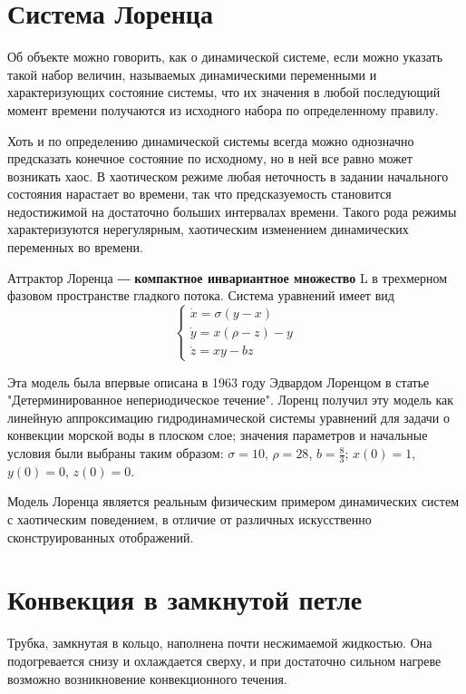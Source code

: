 \documentclass[12pt]{article}
\begin{document}

\newpage

\section{Система Лоренца}

Об объекте можно говорить, как о динамической системе, если можно указать такой набор величин, называемых динамическими переменными и характеризующих состояние системы, что их значения в любой последующий момент времени получаются из исходного набора по определенному правилу.

Хоть и по определению динамической системы всегда можно однозначно предсказать конечное состояние по исходному, но в ней все равно может возникать хаос. В хаотическом режиме любая неточность в задании начального состояния нарастает во времени, так что предсказуемость становится недостижимой на достаточно больших интервалах времени. Такого рода режимы характеризуются нерегулярным, хаотическим изменением динамических переменных во времени.

Аттрактор Лоренца ― \textbf{компактное инвариантное множество} L в трехмерном фазовом пространстве гладкого потока. Система уравнений имеет вид
$$\begin{cases}	
	\dot{x} = \sigma (y-x) \\
	\dot{y} = x(\rho-z)-y \\
	\dot{z} = xy-bz
\end{cases}$$

Эта модель была впервые описана в 1963 году Эдвардом Лоренцом в статье "Детерминированное непериодическое течение". Лоренц получил эту модель как линейную аппроксимацию гидродинамической системы уравнений для задачи о конвекции морской воды в плоском слое; значения параметров и начальные условия были выбраны таким образом: $\sigma = 10$, $\rho = 28$, $b = \frac{8}{3}$; $x(0) = 1$, $y(0) = 0$, $z(0) = 0$.

Модель Лоренца является реальным физическим примером динамических систем с хаотическим поведением, в отличие от различных искусственно сконструированных отображений.

\section{Конвекция в замкнутой петле}

Трубка, замкнутая в кольцо, наполнена почти несжимаемой жидкостью. Она подогревается снизу и охлаждается сверху, и при достаточно сильном нагреве возможно возникновение конвекционного течения.
\end{document}
